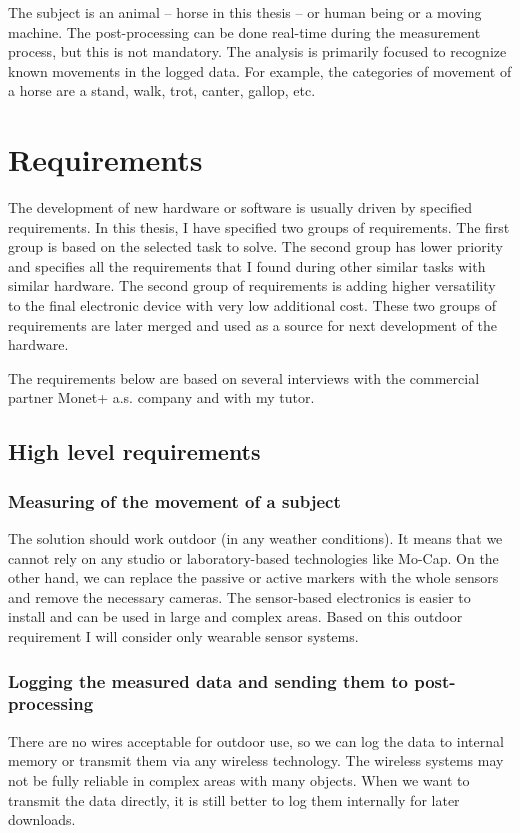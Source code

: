 The subject is an animal -- horse in this thesis -- or human being or a moving machine. The post-processing can be done real-time during the measurement process, but this is not mandatory. The analysis is primarily focused to recognize known movements in the logged data. For example, the categories of movement of a horse are a stand, walk, trot, canter, gallop, etc.

\section{Requirements}
\label{HWrequirements}
The development of new hardware or software is usually driven by specified requirements. In this thesis, I have specified two groups of requirements. The first group is based on the selected task to solve. The second group has lower priority and specifies all the requirements that I found during other similar tasks with similar hardware. The second group of requirements is adding higher versatility to the final electronic device with very low additional cost. These two groups of requirements are later merged and used as a source for next development of the hardware.

The requirements below are based on several interviews with the commercial partner Monet+ a.s. company and with my tutor.

\subsection{High level requirements}

\subsubsection{Measuring of the movement of a subject}
The solution should work outdoor (in any weather conditions). It means that we cannot rely on any studio or laboratory-based technologies like \ac{Mo-Cap}. On the other hand, we can replace the passive or active markers with the whole sensors and remove the necessary cameras. The sensor-based electronics is easier to install and can be used in large and complex areas. Based on this outdoor requirement I will consider only wearable sensor systems.

\subsubsection{Logging the measured data and sending them to post-processing}
There are no wires acceptable for outdoor use, so we can log the data to internal memory or transmit them via any wireless technology. The wireless systems may not be fully reliable in complex areas with many objects. When we want to transmit the data directly, it is still better to log them internally for later downloads.

